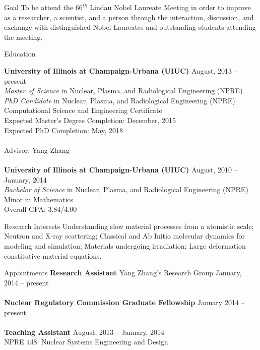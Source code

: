 \documentclass{resume} %
\begin{document}
\begin{rSection}{Goal}
To be attend the 66$^{th}$ Lindau Nobel Laureate Meeting in order to improve as a researcher, a scientist, and a person through the interaction, discussion, and exchange with distinguished Nobel Laureates and outstanding students attending the meeting.
\end{rSection}


\begin{rSection}{Education}

{\bf University of Illinois at Champaign-Urbana (UIUC)} \hfill {August, 2013 -- present} \\
{\it{Master of Science}} in Nuclear, Plasma, and Radiological Engineering (NPRE) \\
{\it{PhD Candidate}} in Nuclear, Plasma, and Radiological Engineering (NPRE) \\
Computational Science and Engineering Certificate \\
Expected Master's Degree Completion: December, 2015 \\
Expected PhD Completion: May, 2018\\
\\
Advisor: Yang Zhang
\\
\\
{\bf University of Illinois at Champaign-Urbana (UIUC)} \hfill { August, 2010 -- January, 2014} \\ 
{\it Bachelor of Science} in Nuclear, Plasma, and Radiological Engineering (NPRE) \\
Minor in Mathematics \\
Overall GPA: 3.84/4.00
\smallskip \\


\end{rSection}

\begin{rSection}{Research Interests}
	Understanding slow material processes from a atomistic scale; Neutron and X-ray scattering; Classical and Ab Initio molecular dynamics for modeling and simulation; Materials undergoing irradiation; Large deformation constitutive material equations.
	\\
\end{rSection}


\begin{rSection}{Appointments}
	{\bf Research Assistant} Yang Zhang's Research Group \hfill {January, 2014 -- present} 
	\\
	\\
	{\bf Nuclear Regulatory Commission Graduate Fellowship} \hfill {January 2014 -- present}
	\\
	\\
	{\bf Teaching Assistant} \hfill {August, 2013 -- January, 2014} \\
	NPRE 448: Nuclear Systems Engineering and Design
	\\
\end{rSection}
\end{document}
